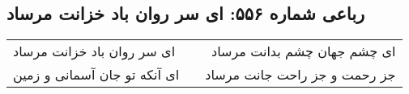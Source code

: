 \begin{center}
\section*{رباعی شماره ۵۵۶: ای سر روان باد خزانت مرساد}
\label{sec:0556}
\begin{longtable}{l p{0.5cm} r}
ای سر روان باد خزانت مرساد
&&
ای چشم جهان چشم بدانت مرساد
\\
ای آنکه تو جان آسمانی و زمین
&&
جز رحمت و جز راحت جانت مرساد
\\
\end{longtable}
\end{center}
